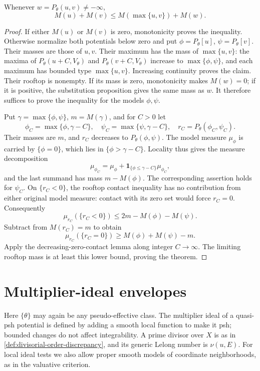 \begin{theorem}\label{thm:rooftop-mass-diamond}
Whenever $w=P_\theta(u,v)\ne-\infty$,
\[
 M(u)+M(v)\leq M(\max\{u,v\})+M(w).
\]
\end{theorem}
\begin{proof}
If either $M(u)$ or $M(v)$ is zero, monotonicity proves the inequality. Otherwise normalize both potentials below zero and put $\phi=P_\theta[u]$, $\psi=P_\theta[v]$. Their masses are those of $u,v$. Their maximum has the mass of $\max\{u,v\}$: the maxima of $P_\theta(u+C,V_\theta)$ and $P_\theta(v+C,V_\theta)$ increase to $\max\{\phi,\psi\}$, and each maximum has bounded type $\max\{u,v\}$. Increasing continuity proves the claim. Their rooftop is nonempty. If its mass is zero, monotonicity makes $M(w)=0$; if it is positive, the substitution proposition gives the same mass as $w$. It therefore suffices to prove the inequality for the models $\phi,\psi$.

Put $\gamma=\max\{\phi,\psi\}$, $m=M(\gamma)$, and for $C>0$ let
\[
 \phi_C=\max\{\phi,\gamma-C\},\quad
 \psi_C=\max\{\psi,\gamma-C\},\quad
 r_C=P_\theta(\phi_C,\psi_C).
\]
Their masses are $m$, and $r_C$ decreases to $P_\theta(\phi,\psi)$. The model measure $\mu_\phi$ is carried by $\{\phi=0\}$, which lies in $\{\phi>\gamma-C\}$. Locality thus gives the measure decomposition
\[
 \mu_{\phi_C}=\mu_\phi+
                  \mathbf1_{\{\phi\leq\gamma-C\}}\mu_{\phi_C},
\]
and the last summand has mass $m-M(\phi)$. The corresponding assertion holds for $\psi_C$. On $\{r_C<0\}$, the rooftop contact inequality has no contribution from either original model measure: contact with its zero set would force $r_C=0$. Consequently
\[
 \mu_{r_C}(\{r_C<0\})\leq2m-M(\phi)-M(\psi).
\]
Subtract from $M(r_C)=m$ to obtain
\[
 \mu_{r_C}(\{r_C=0\})\geq M(\phi)+M(\psi)-m.
\]
Apply the decreasing-zero-contact lemma along integer $C\to\infty$. The limiting rooftop mass is at least this lower bound, proving the theorem.
\end{proof}

\section{Multiplier-ideal envelopes}
\label{sec:multiplier-ideal-envelopes}
Here $\{\theta\}$ may again be any pseudo-effective class. The multiplier ideal of a quasi-psh potential is defined by adding a smooth local function to make it psh; bounded changes do not affect integrability. A prime divisor over $X$ is as in \cref{def:divisorial-order-discrepancy}, and its generic Lelong number is $\nu(u,E)$. For local ideal tests we also allow proper smooth models of coordinate neighborhoods, as in the valuative criterion.

